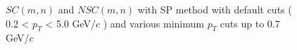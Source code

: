 	\begin{figure}[htbp]
            \begin{center}
              \end{center}
              \caption{$SC(m,n)$ and $NSC(m,n)$ with SP method with default cuts ( 0.2 < $p_T$ < 5.0 GeV/$c$ ) and various minimum $p_T$ cuts up to 0.7 GeV/$c$ }
              \label{fig:SC_pt_withSP_lower}
       \end{figure}


